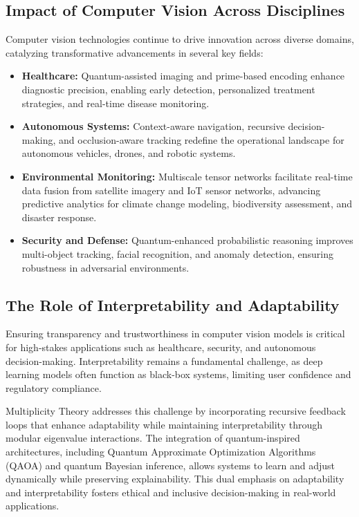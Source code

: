 \documentclass{article}
\theoremstyle{plain}
\begin{document}
\subsection{Impact of Computer Vision Across Disciplines}
Computer vision technologies continue to drive innovation across diverse domains, catalyzing transformative advancements in several key fields:
\begin{itemize}
    \item \textbf{Healthcare:} Quantum-assisted imaging and prime-based encoding enhance diagnostic precision, enabling early detection, personalized treatment strategies, and real-time disease monitoring.
    \item \textbf{Autonomous Systems:} Context-aware navigation, recursive decision-making, and occlusion-aware tracking redefine the operational landscape for autonomous vehicles, drones, and robotic systems.
    \item \textbf{Environmental Monitoring:} Multiscale tensor networks facilitate real-time data fusion from satellite imagery and IoT sensor networks, advancing predictive analytics for climate change modeling, biodiversity assessment, and disaster response.
    \item \textbf{Security and Defense:} Quantum-enhanced probabilistic reasoning improves multi-object tracking, facial recognition, and anomaly detection, ensuring robustness in adversarial environments.
\end{itemize}

\subsection{The Role of Interpretability and Adaptability}
Ensuring transparency and trustworthiness in computer vision models is critical for high-stakes applications such as healthcare, security, and autonomous decision-making. Interpretability remains a fundamental challenge, as deep learning models often function as black-box systems, limiting user confidence and regulatory compliance.

Multiplicity Theory addresses this challenge by incorporating recursive feedback loops that enhance adaptability while maintaining interpretability through modular eigenvalue interactions. The integration of quantum-inspired architectures, including Quantum Approximate Optimization Algorithms (QAOA) and quantum Bayesian inference, allows systems to learn and adjust dynamically while preserving explainability. This dual emphasis on adaptability and interpretability fosters ethical and inclusive decision-making in real-world applications.
\end{document}
